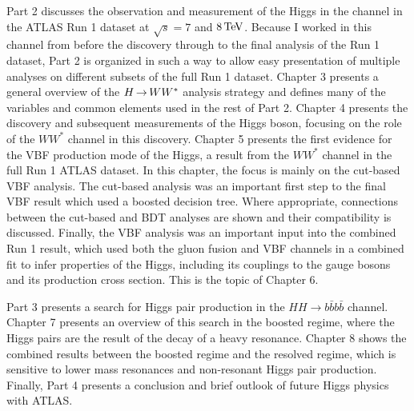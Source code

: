 Part 2 discusses the observation and measurement of the Higgs in the \HWWfull channel in the ATLAS Run 1 dataset at $\sqrt{s} = 7$ and $8 \TeV$. Because I worked in this channel from before the discovery through to the final analysis of the Run 1 dataset, Part 2 is organized in such a way to allow easy presentation of multiple analyses on different subsets of the full Run 1 dataset. Chapter 3 presents a general overview of the $H{\,{\rightarrow}\,}WW^\ast$ analysis strategy and defines many of the variables and common elements used in the rest of Part 2. Chapter 4 presents the discovery and subsequent measurements of the Higgs boson, focusing on the role of the $WW^*$ channel in this discovery. Chapter 5 presents the first evidence for the VBF production mode of the Higgs, a result from the $WW^*$ channel in the full Run 1 ATLAS dataset. In this chapter, the focus is mainly on the cut-based VBF analysis. The cut-based analysis was an important first step to the final VBF result which used a boosted decision tree. Where appropriate, connections between the cut-based and BDT analyses are shown and their compatibility is discussed. Finally, the VBF analysis was an important input into the combined Run 1 \HWWfull result, which used both the gluon fusion and VBF channels in a combined fit to infer properties of the Higgs, including its couplings to the gauge bosons and its production cross section. This is the topic of Chapter 6. 

Part 3 presents a search for Higgs pair production in the $HH \to b\bar{b} b\bar{b}$ channel. Chapter 7 presents an overview of this search in the boosted regime, where the Higgs pairs are the result of the decay of a heavy resonance. Chapter 8 shows the combined results between the boosted regime and the resolved regime, which is sensitive to lower mass resonances and non-resonant Higgs pair production. Finally, Part 4 presents a conclusion and brief outlook of future Higgs physics with ATLAS.